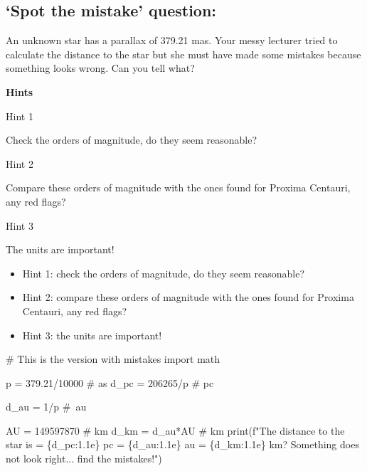 \documentclass[
  letterpaper,
  DIV=11,
  numbers=noendperiod]{scrreprt}
\newenvironment{Shaded}{\begin{snugshade}}{\end{snugshade}}
\newcommand{\BuiltInTok}[1]{\textcolor[rgb]{0.00,0.23,0.31}{#1}}
\newcommand{\CommentTok}[1]{\textcolor[rgb]{0.37,0.37,0.37}{#1}}
\newcommand{\DecValTok}[1]{\textcolor[rgb]{0.68,0.00,0.00}{#1}}
\newcommand{\FloatTok}[1]{\textcolor[rgb]{0.68,0.00,0.00}{#1}}
\newcommand{\ImportTok}[1]{\textcolor[rgb]{0.00,0.46,0.62}{#1}}
\newcommand{\NormalTok}[1]{\textcolor[rgb]{0.00,0.23,0.31}{#1}}
\newcommand{\OperatorTok}[1]{\textcolor[rgb]{0.37,0.37,0.37}{#1}}
\newcommand{\SpecialCharTok}[1]{\textcolor[rgb]{0.37,0.37,0.37}{#1}}
\newcommand{\SpecialStringTok}[1]{\textcolor[rgb]{0.13,0.47,0.30}{#1}}
\providecommand{\tightlist}{%
  \setlength{\itemsep}{0pt}\setlength{\parskip}{0pt}}\usepackage{longtable,booktabs,array}
\begin{document}
\hypertarget{spot-the-mistake-question}{%
\subsection{`Spot the mistake'
question:}\label{spot-the-mistake-question}}

An unknown star has a parallax of 379.21 mas. Your messy lecturer tried
to calculate the distance to the star but she must have made some
mistakes because something looks wrong. Can you tell what?

\textbf{Hints}

Hint 1

Check the orders of magnitude, do they seem reasonable?

Hint 2

Compare these orders of magnitude with the ones found for Proxima
Centauri, any red flags?

Hint 3

The units are important!

\begin{itemize}
\tightlist
\item
  Hint 1: check the orders of magnitude, do they seem reasonable?
\item
  Hint 2: compare these orders of magnitude with the ones found for
  Proxima Centauri, any red flags?
\item
  Hint 3: the units are important!
\end{itemize}

\begin{Shaded}
\begin{Highlighting}[]
\CommentTok{\# This is the version with mistakes}
\ImportTok{import}\NormalTok{ math}

\NormalTok{p }\OperatorTok{=} \FloatTok{379.21}\OperatorTok{/}\DecValTok{10000} \CommentTok{\# as }
\NormalTok{d\_pc }\OperatorTok{=} \DecValTok{206265}\OperatorTok{/}\NormalTok{p }\CommentTok{\# pc}

\NormalTok{d\_au }\OperatorTok{=} \DecValTok{1}\OperatorTok{/}\NormalTok{p }\CommentTok{\# au}

\NormalTok{AU }\OperatorTok{=} \DecValTok{149597870} \CommentTok{\# km}
\NormalTok{d\_km }\OperatorTok{=}\NormalTok{ d\_au}\OperatorTok{*}\NormalTok{AU }\CommentTok{\# km}
\BuiltInTok{print}\NormalTok{(}\SpecialStringTok{f"The distance to the star is = }\SpecialCharTok{\{}\NormalTok{d\_pc}\SpecialCharTok{:1.1e\}}\SpecialStringTok{ pc = }\SpecialCharTok{\{}\NormalTok{d\_au}\SpecialCharTok{:1.1e\}}\SpecialStringTok{ au = }\SpecialCharTok{\{}\NormalTok{d\_km}\SpecialCharTok{:1.1e\}}\SpecialStringTok{ km? Something does not look right... find the mistakes!"}\NormalTok{)}
\end{Highlighting}
\end{Shaded}
\end{document}
